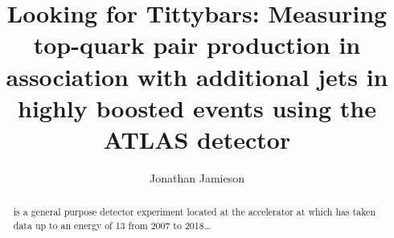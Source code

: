 \documentclass[hyperpdf,nobind,oneside]{hepthesis}
\title{Looking for Tittybars: Measuring top-quark pair production in association with additional jets in highly boosted events using the ATLAS detector}
\author{Jonathan Jamieson}
\begin{document}
\begin{abstract}
  \ATLAS is a general purpose detector experiment located at the \LHC accelerator at \CERN which has taken data up to an energy of \unit{13}{\TeV} from 2007 to 2018\dots
\end{abstract}

\begin{mainmatter}
  
  
  
\end{mainmatter}

\begin{appendices}
  
\end{appendices}

\end{document}
